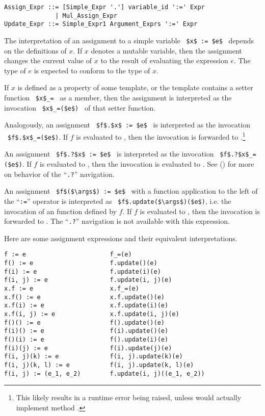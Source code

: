 \syntax\begin{lstlisting}
Assign_Expr ::= [Simple_Expr '.'] variable_id ':=' Expr
              | Mul_Assign_Expr
Update_Expr ::= Simple_Expr1 Argument_Exprs ':=' Expr
\end{lstlisting}

The interpretation of an assignment to a simple variable ~\lstinline!$x$ := $e$!~ depends on the definitions of $x$. If $x$ denotes a mutable variable, then the assignment changes the current value of $x$ to the result of evaluating the expression $e$. The type of $e$ is expected to conform to the type of $x$. 

If $x$ is defined as a property of some template, or the template contains a setter function ~\lstinline!$x$_=!~ as a member, then the assignment is interpreted as the invocation ~\lstinline!$x$_=($e$)!~ of that setter function. 

Analogously, an assignment ~\lstinline!$f$.$x$ := $e$!~ is interpreted as the invocation ~\lstinline!$f$.$x$_=($e$)!. If $f$ is evaluated to , then the invocation is forwarded to .\footnote{This likely results in a runtime error being raised, unless  would actually implement method .} 

An assignment ~\lstinline!$f$.?$x$ := $e$!~ is interpreted as the invocation ~\lstinline!$f$.?$x$_=($e$)!. If $f$ is evaluated to , then the invocation is evaluated to . See () for more on behavior of the ``\lstinline!.?!'' navigation. 

An assignment ~\lstinline!$f$($\args$) := $e$!~ with a function application to the left of the ``\lstinline!:=!'' operator is interpreted as ~\lstinline!$f$.update($\args$)($e$)!, i.e. the invocation of an  function defined by $f$. If $f$ is evaluated to , then the invocation is forwarded to . The ``\lstinline!.?!'' navigation is not available with this expression. 

\example Here are some assignment expressions and their equivalent interpretations. 
\begin{lstlisting}
f := e                       f_=(e)
f() := e                     f.update()(e)
f(i) := e                    f.update(i)(e)
f(i, j) := e                 f.update(i, j)(e)
x.f := e                     x.f_=(e)
x.f() := e                   x.f.update()(e)
x.f(i) := e                  x.f.update(i)(e)
x.f(i, j) := e               x.f.update(i, j)(e)
f()() := e                   f().update()(e)
f(i)() := e                  f(i).update()(e)
f()(i) := e                  f().update(i)(e)
f(i)(j) := e                 f(i).update(j)(e)
f(i, j)(k) := e              f(i, j).update(k)(e)
f(i, j)(k, l) := e           f(i, j).update(k, l)(e)
f(i, j) := (e_1, e_2)        f.update(i, j)((e_1, e_2))
\end{lstlisting}






